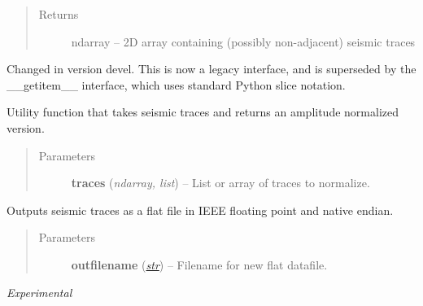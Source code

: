 \documentclass[letterpaper,10pt,english]{sphinxmanual}
\begin{document}
\begin{fulllineitems}
\begin{fulllineitems}
\begin{quote}
\begin{description}
\item[{Returns}] \leavevmode
ndarray -- 2D array containing (possibly non-adjacent) seismic traces

\end{description}\end{quote}
Changed in version devel.
This is now a legacy interface, and is superseded by the \_\_getitem\_\_
interface, which uses standard Python slice notation.

\end{fulllineitems}


\begin{fulllineitems}
\label{segyread:pygeo.segyread.SEGYFile.sNormalize}
Utility function that takes seismic traces and returns an amplitude
normalized version.
\begin{quote}\begin{description}
\item[{Parameters}] \leavevmode
\textbf{traces} (\emph{ndarray, list}) -- List or array of traces to normalize.

\end{description}\end{quote}

\end{fulllineitems}


\begin{fulllineitems}
\label{segyread:pygeo.segyread.SEGYFile.writeFlat}
Outputs seismic traces as a flat file in IEEE floating point and
native endian.
\begin{quote}\begin{description}
\item[{Parameters}] \leavevmode
\textbf{outfilename} (\href{http://docs.python.org/library/functions.html\#str}{\emph{str}}) -- Filename for new flat datafile.

\end{description}\end{quote}

\emph{Experimental}

\end{fulllineitems}



\end{fulllineitems}
\end{document}
